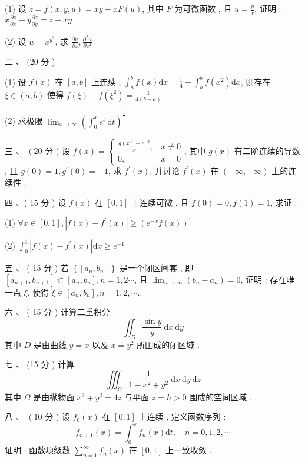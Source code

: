 \documentclass[10pt]{article}
\begin{document}
{(1)  设  $z=f(x, y, u)=x y+x F(u)$,  其中  $F$  为可微函数 ,  且  $u=\frac{y}{x}$,  证明 : $x \frac{\partial z}{\partial x}+y \frac{\partial z}{\partial y}=z+x y$

(2)  设  $u=x^{y^{2}}$,  求  $\frac{\partial u}{\partial z}, \frac{\partial^{2} u}{\partial z^{2}}$

 二 、 $(20$  分 )

(1)  设  $f(x)$  在  $[a, b]$  上连续 , $\int_{a}^{b} f(x) \mathrm{d} x=\frac{1}{4}+\int_{a}^{b} f\left(x^{2}\right) \mathrm{d} x$,  则存在  $\xi \in(a, b)$  使得  $f(\xi)-f\left(\xi^{2}\right)=\frac{1}{4(b-a)}$.

(2)  求极限  $\lim _{x \rightarrow \infty}\left(\int_{0}^{x} e^{t} \mathrm{~d} t\right)^{\frac{1}{x}}$

 三 、 $\left(20\right.$  分  )  设  $f(x)=\left\{\begin{array}{cc}\frac{g(x)-e^{-x}}{x}, & x \neq 0 \\ 0, & x=0\end{array}\right.$,  其中  $g(x)$  有二阶连续的导数 ,  且  $g(0)=1, g^{\prime}(0)=-1$,  求  $f^{\prime}(x)$,  并讨论  $f^{\prime}(x)$  在  $(-\infty,+\infty)$  上的连续性 .

 四 、( 15  分 )  设  $f(x)$  在  $[0,1]$  上连续可微 ,  且  $f(0)=0, f(1)=1$,  求证 :

(1) $\forall x \in[0,1],\left|f(x)-f^{\prime}(x)\right| \geq\left(e^{-x} f(x)\right)^{\prime}$

(2) $\int_{0}^{1}\left|f(x)-f^{\prime}(x)\right| \mathrm{d} x \geq e^{-1}$

 五 、 ( 15  分 )  若  $\left\{\left[a_{n}, b_{n}\right]\right\}$  是一个闭区间套 ,  即  $\left[a_{n+1}, b_{n+1}\right] \subset\left[a_{n}, b_{n}\right], n=1,2 \cdots$,  且  $\lim _{n \rightarrow \infty}\left(b_{n}-a_{n}\right)=0$,  证明 :  存在唯一点  $\xi$,  使得  $\xi \in\left[a_{n}, b_{n}\right], n=1,2, \cdots .$.

 六 、 ( 15  分 )  计算二重积分 
$$
\iint_{D} \frac{\sin y}{y} \mathrm{~d} x \mathrm{~d} y
$$
 其中  $D$  是由曲线  $y=x$  以及  $x=y^{2}$  所围成的闭区域 .

 七 、 (15  分 )  计算 
$$
\iiint_{\Omega} \frac{1}{1+x^{2}+y^{2}} \mathrm{~d} x \mathrm{~d} y \mathrm{~d} z
$$
 其中  $\Omega$  是由抛物面  $x^{2}+y^{2}=4 z$  与平面  $z=h>0$  围成的空间区域 .

 八 、 $\left(10\right.$  分 )  设  $f_{0}(x)$  在  $[0,1]$  上连续 ,  定义函数序列 :
$$
f_{n+1}(x)=\int_{0}^{x} f_{n}(x) \mathrm{d} t, \quad n=0,1,2, \cdots
$$
 证明 :  函数项级数  $\sum_{n=1}^{\infty} f_{n}(x)$  在  $[0,1]$  上一致收敛 .

}
\end{document}
